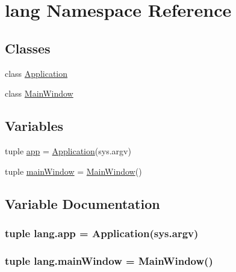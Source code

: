 \hypertarget{namespacelang}{}\section{lang Namespace Reference}
\label{namespacelang}
\subsection*{Classes}
\begin{DoxyCompactItemize}
\item 
class \hyperlink{classlang_1_1Application}{Application}
\item 
class \hyperlink{classlang_1_1MainWindow}{Main\+Window}
\end{DoxyCompactItemize}
\subsection*{Variables}
\begin{DoxyCompactItemize}
\item 
tuple \hyperlink{namespacelang_aa1745a5b4f252cc94c0176918ef4e7a2}{app} = \hyperlink{classlang_1_1Application}{Application}(sys.\+argv)
\item 
tuple \hyperlink{namespacelang_a93280d6df1d44fb20e3e2d2501253ba2}{main\+Window} = \hyperlink{classlang_1_1MainWindow}{Main\+Window}()
\end{DoxyCompactItemize}


\subsection{Variable Documentation}
\hypertarget{namespacelang_aa1745a5b4f252cc94c0176918ef4e7a2}{}
\subsubsection[{app}]{\setlength{\rightskip}{0pt plus 5cm}tuple lang.\+app = {\bf Application}(sys.\+argv)}\label{namespacelang_aa1745a5b4f252cc94c0176918ef4e7a2}
\hypertarget{namespacelang_a93280d6df1d44fb20e3e2d2501253ba2}{}
\subsubsection[{main\+Window}]{\setlength{\rightskip}{0pt plus 5cm}tuple lang.\+main\+Window = {\bf Main\+Window}()}\label{namespacelang_a93280d6df1d44fb20e3e2d2501253ba2}
